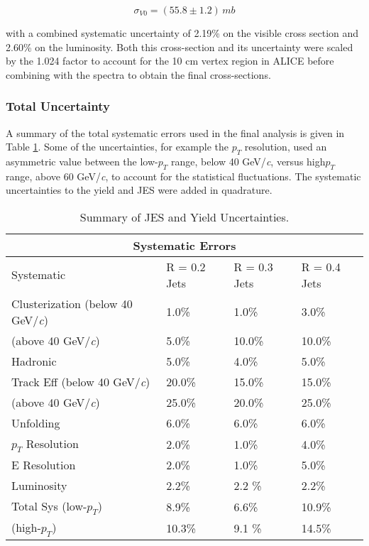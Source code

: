 \begin{equation}
\sigma_{V0} = (55.8 \pm 1.2) \, mb
\label{eq:xlumdef}
\end{equation}

\noindent
with a combined systematic uncertainty of 2.19\% on the visible cross section and 2.60\% on the luminosity.  Both this cross-section and its uncertainty were scaled by the 1.024 factor to account for the 10 cm vertex region in ALICE before combining with the spectra to obtain the final cross-sections.


\subsubsection{Total Uncertainty}

A summary of the total systematic errors used in the final analysis is given in Table \ref{table:1}.  Some of the uncertainties, for example the $p_{T}$ resolution, used an asymmetric value between the low-$p_{T}$ range, below 40 GeV/\textit{c}, versus high$p_{T}$ range, above 60 GeV/\textit{c}, to account for the statistical fluctuations.  The systematic uncertainties to the yield and JES were added in quadrature.
\newline

\begin{table}[h!]
\centering
\caption{Summary of JES and Yield Uncertainties.}
\begin{tabular}{ |p{5cm}||p{3cm}|p{3cm}|p{3cm}|  }
 \hline
 \multicolumn{4}{|c|}{Systematic Errors} \\
 \hline
 Systematic &R = 0.2 Jets & R = 0.3 Jets& R = 0.4 Jets\\
 \hline
Clusterization (below 40 GeV/\textit{c}) & 1.0\%    &1.0\%&  3.0\%\\
 (above 40 GeV/\textit{c})           &  5.0\%  & 10.0\%   &  10.0\%\\
Hadronic &   5.0\% & 4.0\% & 5.0\%\\
Track Eff (below 40 GeV/\textit{c})&20.0\% & 15.0\% & 15.0\%\\
 (above 40 GeV/\textit{c})            &  25.0\%  & 20.0\%   &  25.0\%\\
Unfolding & 6.0\% & 6.0\%&  6.0\%\\
$p_{T}$ Resolution & 2.0\% & 1.0\% & 4.0\%\\
E Resolution& 2.0\%   &1.0\% & 5.0\%\\
Luminosity & 2.2\%  & 2.2 \% & 2.2\%\\
 \hline
 \hline
Total Sys (low-$p_{T}$) & 8.9\%  & 6.6\% & 10.9\%\\
(high-$p_{T}$) & 10.3\%  & 9.1 \% & 14.5\%\\
\hline
\end{tabular}

\label{table:1}
\end{table}


